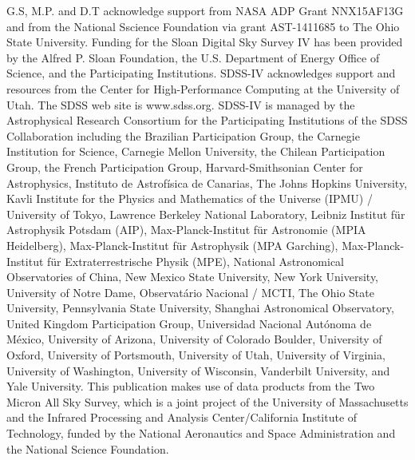 \documentclass[manuscript]{aastex6}
\begin{document}
G.S, M.P. and D.T acknowledge support from NASA ADP Grant NNX15AF13G and from
the National Sscience Foundation via grant AST-1411685 to The Ohio State
University. 
Funding for the Sloan Digital Sky Survey IV has been provided by the Alfred P.
Sloan Foundation, the U.S. Department of Energy Office of Science, and the
Participating Institutions. SDSS-IV acknowledges support and resources from the
Center for High-Performance Computing at the University of Utah. The SDSS web
site is www.sdss.org. SDSS-IV is managed by the Astrophysical Research
Consortium for the Participating Institutions of the SDSS Collaboration
including the Brazilian Participation Group, the Carnegie Institution for
Science, Carnegie Mellon University, the Chilean Participation Group, the
French Participation Group, Harvard-Smithsonian Center for Astrophysics,
Instituto de Astrof\'isica de Canarias, The Johns Hopkins University, Kavli
Institute for the Physics and Mathematics of the Universe (IPMU) / University
of Tokyo, Lawrence Berkeley National Laboratory, Leibniz Institut f\"ur
Astrophysik Potsdam (AIP), Max-Planck-Institut f\"ur Astronomie (MPIA
Heidelberg), Max-Planck-Institut f\"ur Astrophysik (MPA Garching),
Max-Planck-Institut f\"ur Extraterrestrische Physik (MPE), National
Astronomical Observatories of China, New Mexico State University, New York
University, University of Notre Dame, Observat\'ario Nacional / MCTI, The Ohio
State University, Pennsylvania State University, Shanghai Astronomical
Observatory, United Kingdom Participation Group, Universidad Nacional
Aut\'onoma de M\'exico, University of Arizona, University of Colorado Boulder,
University of Oxford, University of Portsmouth, University of Utah, University
of Virginia, University of Washington, University of Wisconsin, Vanderbilt
University, and Yale University.  This publication makes use of data products
from the Two Micron All Sky Survey, which is a joint project of the University
of Massachusetts and the Infrared Processing and Analysis Center/California
Institute of Technology, funded by the National Aeronautics and Space
Administration and the National Science Foundation. 



\onecolumngrid






\end{document}

